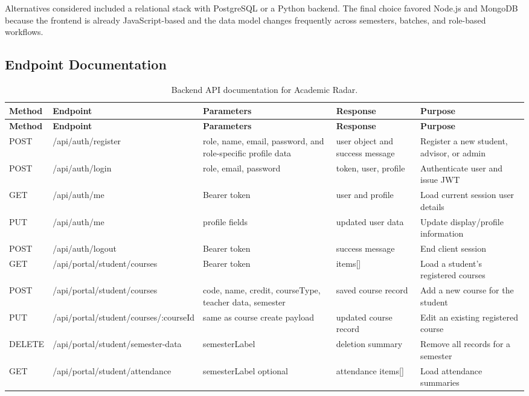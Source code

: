 \documentclass[12pt,a4paper]{article}
\begin{document}
Alternatives considered included a relational stack with PostgreSQL or a Python backend. The final choice favored Node.js and MongoDB because the frontend is already JavaScript-based and the data model changes frequently across semesters, batches, and role-based workflows.

\subsection{Endpoint Documentation}
\small
\begin{longtable}{L{1.6cm}L{3.2cm}L{3.4cm}L{5.0cm}L{2.2cm}}
\caption{Backend API documentation for Academic Radar.}\\
\toprule
\textbf{Method} & \textbf{Endpoint} & \textbf{Parameters} & \textbf{Response} & \textbf{Purpose} \\
\midrule
\endfirsthead
\toprule
\textbf{Method} & \textbf{Endpoint} & \textbf{Parameters} & \textbf{Response} & \textbf{Purpose} \\
\midrule
\endhead
POST & /api/auth/register & role, name, email, password, and role-specific profile data & user object and success message & Register a new student, advisor, or admin \\
POST & /api/auth/login & role, email, password & token, user, profile & Authenticate user and issue JWT \\
GET & /api/auth/me & Bearer token & user and profile & Load current session user details \\
PUT & /api/auth/me & profile fields & updated user data & Update display/profile information \\
POST & /api/auth/logout & Bearer token & success message & End client session \\
GET & /api/portal/student/courses & Bearer token & items[] & Load a student's registered courses \\
POST & /api/portal/student/courses & code, name, credit, courseType, teacher data, semester & saved course record & Add a new course for the student \\
PUT & /api/portal/student/courses/:courseId & same as course create payload & updated course record & Edit an existing registered course \\
DELETE & /api/portal/student/semester-data & semesterLabel & deletion summary & Remove all records for a semester \\
GET & /api/portal/student/attendance & semesterLabel optional & attendance items[] & Load attendance summaries \\

\end{longtable}
\end{document}
